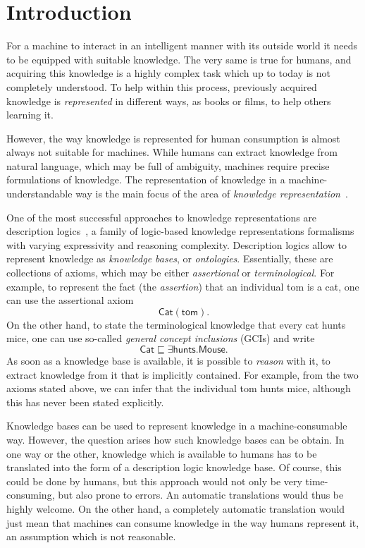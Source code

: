 \chapter{Introduction}
\label{cha:introduction}

For a machine to interact in an intelligent manner with its outside world it needs to be
equipped with suitable knowledge.  The very same is true for humans, and acquiring this
knowledge is a highly complex task which up to today is not completely understood.  To
help within this process, previously acquired knowledge is \emph{represented} in different
ways, \eg as books or films, to help others learning it.

However, the way knowledge is represented for human consumption is almost always not
suitable for machines.  While humans can extract knowledge from natural language, which
may be full of ambiguity, machines require precise formulations of knowledge.  The
representation of knowledge in a machine-understandable way is the main focus of the area
of \emph{knowledge representation}~\cite{KRhandbook}.

One of the most successful approaches to knowledge representations are description
logics~\cite{DLhandbook}, a family of logic-based knowledge representations formalisms
with varying expressivity and reasoning complexity.  Description logics allow to represent
knowledge as \emph{knowledge bases}, or \emph{ontologies}.  Essentially, these are
collections of axioms, which may be either \emph{assertional} or \emph{terminological}.
For example, to represent the fact (the \emph{assertion}) that an individual \textsf{tom}
is a cat, one can use the assertional axiom
\begin{equation}
  \label{eq:14}
  \mathsf{Cat}(\mathsf{tom}).
\end{equation}
On the other hand, to state the terminological knowledge that every cat hunts mice, one
can use so-called \emph{general concept inclusions} (GCIs) and write
\begin{equation}
  \label{eq:15}
  \mathsf{Cat} \sqsubseteq \exists \mathsf{hunts}. \mathsf{Mouse}.
\end{equation}
As soon as a knowledge base is available, it is possible to \emph{reason} with it, \ie to
extract knowledge from it that is implicitly contained.  For example, from the two axioms
stated above, we can infer that the individual \textsf{tom} hunts mice, although this has
never been stated explicitly.

Knowledge bases can be used to represent knowledge in a machine-consumable way.  However,
the question arises how such knowledge bases can be obtain.  In one way or the other,
knowledge which is available to humans has to be translated into the form of a description
logic knowledge base.  Of course, this could be done by humans, but this approach would
not only be very time-consuming, but also prone to errors.  An automatic translations
would thus be highly welcome.  On the other hand, a completely automatic translation would
just mean that machines can consume knowledge in the way humans represent it, an
assumption which is not reasonable.

